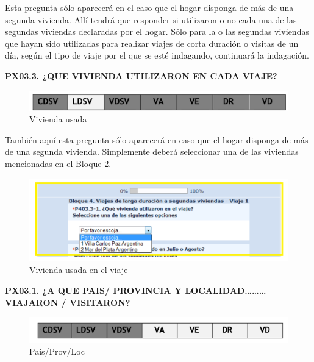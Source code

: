 \documentclass[
  openany]{book}
\begin{document}
Esta pregunta sólo aparecerá en el caso que el hogar disponga de más de una segunda vivienda. Allí tendrá que responder si utilizaron o no cada una de las segundas viviendas declaradas por el hogar. Sólo para la o las segundas viviendas que hayan sido utilizadas para realizar viajes de corta duración o visitas de un día, según el tipo de viaje por el que se esté indagando, continuará la indagación.

\textbf{PX03.3. ¿QUE VIVIENDA UTILIZARON EN CADA VIAJE?}

\begin{figure}

{\centering \includegraphics[width=1\linewidth]{imagenes/figura6-78} 

}

\caption{Vivienda usada}\label{fig:queusaron}
\end{figure}

También aquí esta pregunta sólo aparecerá en caso que el hogar disponga de más de una segunda vivienda. Simplemente deberá seleccionar una de las viviendas mencionadas en el Bloque 2.

\begin{figure}

{\centering \includegraphics[width=1\linewidth]{imagenes/figura6-79} 

}

\caption{Vivienda usada en el viaje}\label{fig:queusaronenel}
\end{figure}

\textbf{PX03.1. ¿A QUE PAIS/ PROVINCIA Y LOCALIDAD\ldots\ldots\ldots VIAJARON / VISITARON?}

\begin{figure}

{\centering \includegraphics[width=1\linewidth]{imagenes/figura6-80} 

}

\caption{País/Prov/Loc}\label{fig:donde9}
\end{figure}
\end{document}
